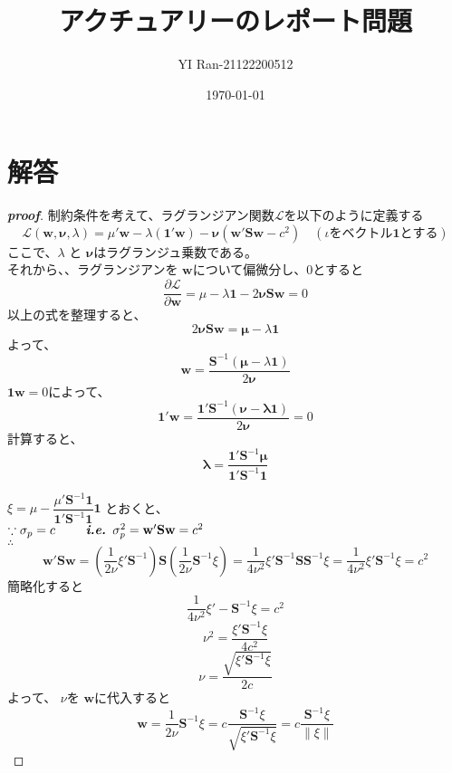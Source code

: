 \documentclass[a4paper,11pt]{jsarticle}
\title{\vspace{-4cm}アクチュアリーのレポート問題}
\author{YI Ran-21122200512}
\date{\today}
\begin{document}
\maketitle
\vspace{-0.4cm}
\section*{解答}
\begin{proof}[\textbf{proof}]
制約条件を考えて、ラグランジアン関数$\mathcal{L}$を以下のように定義する
\begin{equation*}
\mathcal{L}(\mathbf{w} ,\mathbf{\nu} ,\lambda)=\mu ' \mathbf{w}-\lambda(\mathbf{1}' \mathbf{w})-\mathbf{\nu}(\mathbf{w}' \mathbf{S} \mathbf{w}-c^2)\quad (\iota を ベクトル \mathbf{1}とする)
\end{equation*}
ここで、$\lambda$ と $\mathbf{\nu}$はラグランジュ乗数である。\\
それから、、ラグランジアンを $\mathbf{w}$について偏微分し、0とすると\\
$$\dfrac{\partial\mathcal{L}}{\partial\mathbf{w}}=\mu-\lambda \mathbf{1}-2 \mathbf{\nu} \mathbf{S} \mathbf{w}=0$$
以上の式を整理すると、\\
$$2 \mathbf{\nu} \mathbf{S} \mathbf{w} = \mathbf{\mu}-\lambda \mathbf{1}$$
よって、\\
$$ \mathbf{w} = \dfrac{\mathbf{S}^{-1}(\mathbf{\mu}-\lambda \mathbf{1})}{2 \mathbf{\nu}} $$
$\mathbf{1} \mathbf{w} = 0$によって、\\
$$ \mathbf{1}'\mathbf{w} = \dfrac{\mathbf{1}' \mathbf{S}^{-1}(\mathbf{\nu}-\mathbf{\lambda \mathbf{1}})}{2 \mathbf{\nu}} = 0 $$
計算すると、\\
$$ \mathbf{\lambda} = \dfrac{\mathbf{1}' \mathbf{S}^{-1}\mathbf{\mu}}{\mathbf{1}' \mathbf{S}^{-1} \mathbf{1}}$$

$\xi = \mu-\dfrac{\mu ' \mathbf{S}^{-1}\mathbf{1}}{\mathbf{1}' \mathbf{S}^{-1} \mathbf{1}} \mathbf{1}$ とおくと、\\
$\because \sigma_p = c \qquad\textbf{\textit{ i.e. }} \sigma_p^2 = \mathbf{w}' \mathbf{S} \mathbf{w} = c^2$\\
$ \therefore $\\
\[  
\mathbf{w}' \mathbf{S} \mathbf{w} = \left( \frac{1}{2\nu} \xi' \mathbf{S}^{-1} \right) \mathbf{S} \left( \frac{1}{2\nu} \mathbf{S}^{-1} \xi \right) = \frac{1}{4\nu^2} \xi' \mathbf{S}^{-1} \mathbf{S} \mathbf{S}^{-1} \xi = \frac{1}{4\nu^2} \xi' \mathbf{S}^{-1} \xi = c^2  
\]
簡略化すると\\
$$\dfrac{1}{4\nu^2}\xi'-\mathbf{S}^{-1}\xi  = c^2$$
$$\nu^2 = \dfrac{\xi'\mathbf{S}^{-1}\xi}{4c^2}$$
$$\nu = \dfrac{\sqrt{\xi'\mathbf{S}^{-1}\xi}}{2c}$$ 
よって、 $\nu$を $\mathbf{w}$に代入すると\\
$$
\mathbf{w} 
  = \dfrac{1}{2 \nu}\mathbf{S}^{-1}\xi 
  =c\dfrac{\mathbf{S}^{-1}\xi}{\textstyle\sqrt{\xi' \mathbf{S}^{-1}\xi}} 
  =c\dfrac{\mathbf{S}^{-1}\xi}{\|\xi\|}
$$
\end{proof}
\end{document}
